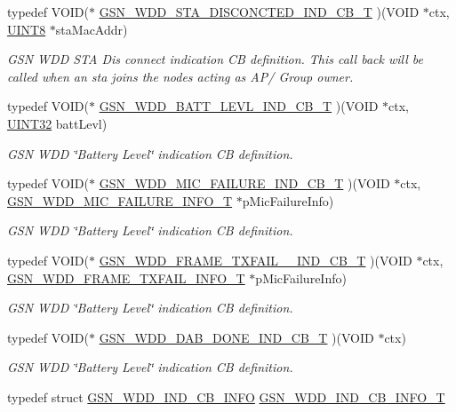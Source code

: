 \begin{DoxyCompactItemize}
typedef VOID($\ast$ \hyperlink{a00677_ga3a4ef614815eaa2e3085c2d168a1ced5}{GSN\_\-WDD\_\-STA\_\-DISCONCTED\_\-IND\_\-CB\_\-T} )(VOID $\ast$ctx, \hyperlink{a00660_gab27e9918b538ce9d8ca692479b375b6a}{UINT8} $\ast$staMacAddr)
\begin{DoxyCompactList}\small\item\em GSN WDD STA Dis connect indication CB definition. This call back will be called when an sta joins the nodes acting as AP/ Group owner. \end{DoxyCompactList}\item 
typedef VOID($\ast$ \hyperlink{a00677_gae1fd7b71fd69db9cad751f084daf2199}{GSN\_\-WDD\_\-BATT\_\-LEVL\_\-IND\_\-CB\_\-T} )(VOID $\ast$ctx, \hyperlink{a00660_gae1e6edbbc26d6fbc71a90190d0266018}{UINT32} battLevl)
\begin{DoxyCompactList}\small\item\em GSN WDD \char`\"{}Battery Level\char`\"{} indication CB definition. \end{DoxyCompactList}\item 
typedef VOID($\ast$ \hyperlink{a00677_ga7ccb461a81661940f165a9e3d1812421}{GSN\_\-WDD\_\-MIC\_\-FAILURE\_\-IND\_\-CB\_\-T} )(VOID $\ast$ctx, \hyperlink{a00391}{GSN\_\-WDD\_\-MIC\_\-FAILURE\_\-INFO\_\-T} $\ast$pMicFailureInfo)
\begin{DoxyCompactList}\small\item\em GSN WDD \char`\"{}Battery Level\char`\"{} indication CB definition. \end{DoxyCompactList}\item 
typedef VOID($\ast$ \hyperlink{a00677_ga7e71a759def3d63d0aff2122a2b21bef}{GSN\_\-WDD\_\-FRAME\_\-TXFAIL\_\-\_\-IND\_\-CB\_\-T} )(VOID $\ast$ctx, \hyperlink{a00382}{GSN\_\-WDD\_\-FRAME\_\-TXFAIL\_\-INFO\_\-T} $\ast$pMicFailureInfo)
\begin{DoxyCompactList}\small\item\em GSN WDD \char`\"{}Battery Level\char`\"{} indication CB definition. \end{DoxyCompactList}\item 
typedef VOID($\ast$ \hyperlink{a00677_ga609ae39dc432b9821b764bea4957369a}{GSN\_\-WDD\_\-DAB\_\-DONE\_\-IND\_\-CB\_\-T} )(VOID $\ast$ctx)
\begin{DoxyCompactList}\small\item\em GSN WDD \char`\"{}Battery Level\char`\"{} indication CB definition. \end{DoxyCompactList}\item 
typedef struct \hyperlink{a00275}{GSN\_\-WDD\_\-IND\_\-CB\_\-INFO} \hyperlink{a00677_gaeb9f80300f95181d19a845e3f786daae}{GSN\_\-WDD\_\-IND\_\-CB\_\-INFO\_\-T}

\end{DoxyCompactItemize}
